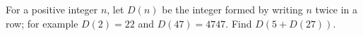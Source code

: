 For a positive integer $n$, let $D(n)$ be the integer formed by writing $n$ twice in a row; for example $D(2)=22$ and $D(47)=4747$. Find $D(5+D(27))$.
